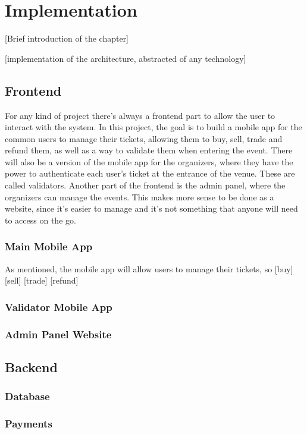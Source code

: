 \chapter{Implementation}
 [Brief introduction of the chapter]

 [implementation of the architecture, abstracted of any technology]

\section{Frontend}
For any kind of project there's always a frontend part to allow the user to interact with the system. In this project, the goal is to build a mobile app for the common users to manage their tickets, allowing them to buy, sell, trade and refund them, as well as a way to validate them when entering the event.
There will also be a version of the mobile app for the organizers, where they have the power to authenticate each user's ticket at the entrance of the venue. These are called validators.
Another part of the frontend is the admin panel, where the organizers can manage the events. This makes more sense to be done as a website, since it's easier to manage and it's not something that anyone will need to access on the go.

\subsection{Main Mobile App}
As mentioned, the mobile app will allow users to manage their tickets, so
    [buy]
    [sell]
    [trade]
    [refund]

\subsection{Validator Mobile App}

\subsection{Admin Panel Website}


\section{Backend}

\subsection{Database}

\subsection{Payments}
